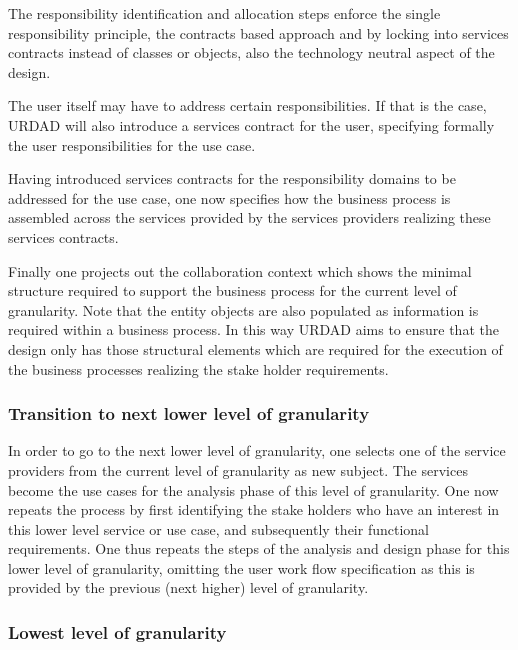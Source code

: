 The responsibility identification and allocation steps enforce the single responsibility principle, the
contracts based approach and by locking into services contracts instead of
classes or objects, also the technology neutral aspect of the design.


The user itself may have to address certain responsibilities. If that is the
case, URDAD will also introduce a services contract for the user, specifying
formally the user responsibilities for the use case.

Having introduced services contracts for the responsibility domains to
be addressed for the use case, one now specifies how the business process is
assembled across the services provided by the services providers realizing these
services contracts.

Finally one projects out the collaboration context which shows the minimal structure
required to support the business process for the current level of granularity. Note
that the entity objects are also populated as information is required within a business
process. In this way URDAD aims to ensure that the design only has those structural
elements which are required for the execution of the business processes realizing the
stake holder requirements.


\subsubsection{Transition to next lower level of granularity}

In order to go to the next lower level of granularity, one
selects one of the service providers from the current level of granularity
as new subject. The services become the use cases for the analysis phase
of this level of granularity. One now repeats the process by first identifying
the stake holders who have an interest in this lower level service or use case,
and subsequently their functional requirements.
One thus repeats the steps of the analysis and design phase for this lower
level of granularity, omitting the user work flow specification as this is
provided by the previous (next higher) level of granularity.


\subsubsection{Lowest level of granularity}

